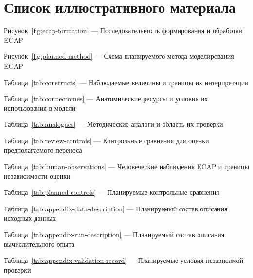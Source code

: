\chapter*{Список иллюстративного материала}
\noindent Рисунок~\ref{fig:ecap-formation} — Последовательность формирования и обработки ECAP\dotfill\pageref{fig:ecap-formation}\par
\noindent Рисунок~\ref{fig:planned-method} — Схема планируемого метода моделирования ECAP\dotfill\pageref{fig:planned-method}\par
\medskip
\noindent Таблица~\ref{tab:constructs} — Наблюдаемые величины и границы их интерпретации\dotfill\pageref{tab:constructs}\par
\noindent Таблица~\ref{tab:connectomes} — Анатомические ресурсы и условия их использования в модели\dotfill\pageref{tab:connectomes}\par
\noindent Таблица~\ref{tab:analogues} — Методические аналоги и область их проверки\dotfill\pageref{tab:analogues}\par
\noindent Таблица~\ref{tab:review-controls} — Контрольные сравнения для оценки предполагаемого переноса\dotfill\pageref{tab:review-controls}\par
\noindent Таблица~\ref{tab:human-observations} — Человеческие наблюдения ECAP и границы независимости оценки\dotfill\pageref{tab:human-observations}\par
\noindent Таблица~\ref{tab:planned-controls} — Планируемые контрольные сравнения\dotfill\pageref{tab:planned-controls}\par
\noindent Таблица~\ref{tab:appendix-data-description} — Планируемый состав описания исходных данных\dotfill\pageref{tab:appendix-data-description}\par
\noindent Таблица~\ref{tab:appendix-run-description} — Планируемый состав описания вычислительного опыта\dotfill\pageref{tab:appendix-run-description}\par
\noindent Таблица~\ref{tab:appendix-validation-record} — Планируемые условия независимой проверки\dotfill\pageref{tab:appendix-validation-record}\par
